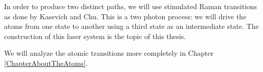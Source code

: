 In order to produce two distinct paths, we will use stimulated Raman transitions as done by Kasevich and Chu\cite{kasevichChu1991}. This is a two photon process: we will drive the atoms from one state to another using a third state as an intermediate state.  The construction of this laser system is the topic of this thesis.


We will analyze the atomic transitions more completely in Chapter \ref{ChapterAboutTheAtoms}.




